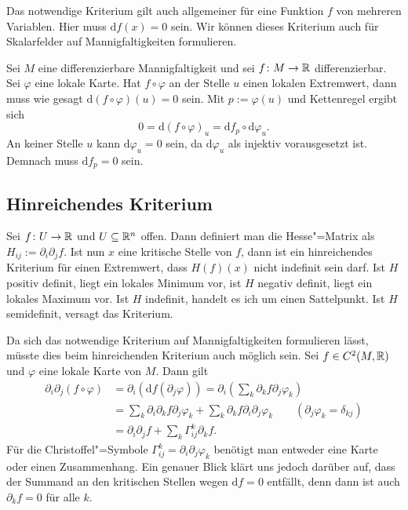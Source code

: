 Das notwendige Kriterium gilt auch allgemeiner für eine Funktion $f$
von mehreren Variablen. Hier muss $\mathrm df(x)=0$ sein.
Wir können dieses Kriterium auch für Skalarfelder auf
Mannigfaltigkeiten formulieren.

Sei $M$ eine differenzierbare Mannigfaltigkeit und sei
$f\colon M\to\mathbb R$ differenzierbar. Sei $\varphi$ eine lokale
Karte. Hat $f\circ\varphi$ an der Stelle $u$ einen lokalen Extremwert,
dann muss wie gesagt $\mathrm d(f\circ\varphi)(u)=0$ sein.
Mit $p:=\varphi(u)$ und Kettenregel ergibt sich%
\begin{equation}
0 = \mathrm d(f\circ\varphi)_u = \mathrm df_p\circ\mathrm d\varphi_u.
\end{equation}
An keiner Stelle $u$ kann $\mathrm d\varphi_u=0$ sein, da
$\mathrm d\varphi_u$ als injektiv vorausgesetzt ist. Demnach muss
$\mathrm df_p=0$ sein.


\subsection{Hinreichendes Kriterium}

Sei $f\colon U\to\mathbb R$ und $U\subseteq\mathbb R^n$ offen. Dann definiert
man die Hesse"=Matrix als $H_{ij}:=\partial_i\partial_j f$.
Ist nun $x$ eine kritische Stelle von $f$, dann ist ein
hinreichendes Kriterium für einen Extremwert, dass $H(f)(x)$ nicht
indefinit sein darf. Ist $H$ positiv definit, liegt ein lokales
Minimum vor, ist $H$ negativ definit, liegt ein lokales Maximum
vor. Ist $H$ indefinit, handelt es ich um einen Sattelpunkt.
Ist $H$ semidefinit, versagt das Kriterium.

Da sich das notwendige Kriterium auf Mannigfaltigkeiten formulieren
lässt, müsste dies beim hinreichenden Kriterium auch möglich sein.
Sei $f\in C^2(M,\mathbb R)$ und $\varphi$ eine lokale Karte von $M$. Dann
gilt%
\begin{align}
\partial_i\partial_j(f\circ\varphi)
&= \partial_i(\mathrm df(\partial_j\varphi))
= \partial_i(\sum_k \partial_k f\partial_j\varphi_k)\\
&= \sum_k \partial_i\partial_k f\partial_j\varphi_k
+ \sum_k \partial_k f\partial_i\partial_j\varphi_k
\qquad (\partial_j\varphi_k=\delta_{kj})\\
&= \partial_i\partial_j f + \sum_k\Gamma_{ij}^k\partial_k f.
\end{align}
Für die Christoffel"=Symbole
$\Gamma_{ij}^k = \partial_i\partial_j\varphi_k$
benötigt man entweder eine Karte oder einen Zusammenhang.
Ein genauer Blick klärt uns jedoch darüber auf, dass der Summand
an den kritischen Stellen wegen $\mathrm df=0$ entfällt, denn
dann ist auch $\partial_k f=0$ für alle $k$.

